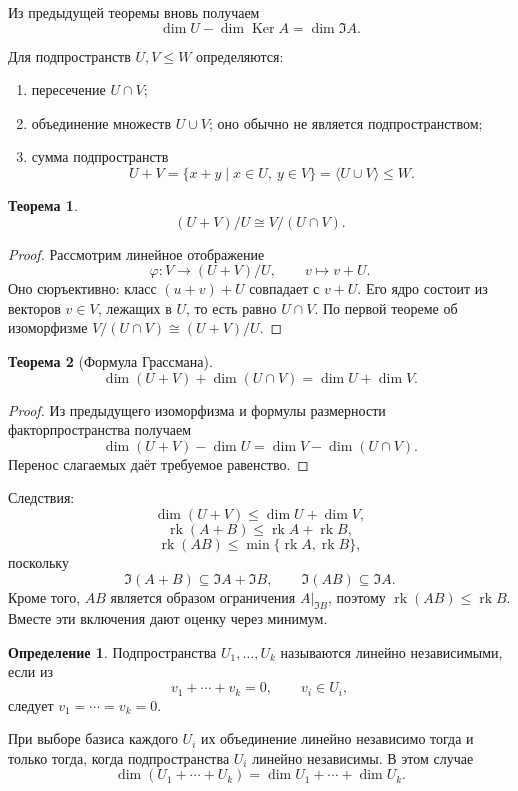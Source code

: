 \documentclass[12pt,a4paper,oneside,openany]{book}
\theoremstyle{definition}
\newtheorem{definition}{Определение}[chapter]
\theoremstyle{plain}
\newtheorem{theorem}{Теорема}[chapter]
\theoremstyle{remark}
\DeclareMathOperator{\Ker}{Ker}
\DeclareMathOperator{\rk}{rk}
\begin{document}
Из предыдущей теоремы вновь получаем
\[
  \dim U-\dim\Ker A=\dim\Im A.
\]

Для подпространств $U,V\leq W$ определяются:
\begin{enumerate}[label=\arabic*)]
  \item пересечение $U\cap V$;
  \item объединение множеств $U\cup V$; оно обычно не является
  подпространством;
  \item сумма подпространств
  \[
    U+V=\{x+y\mid x\in U,\ y\in V\}=\langle U\cup V\rangle\leq W.
  \]
\end{enumerate}

\begin{theorem}
\[
  (U+V)/U\cong V/(U\cap V).
\]
\end{theorem}

\begin{proof}
Рассмотрим линейное отображение
\[
  \varphi\colon V\to(U+V)/U,\qquad v\mapsto v+U.
\]
Оно сюръективно: класс $(u+v)+U$ совпадает с $v+U$. Его ядро состоит из
векторов $v\in V$, лежащих в $U$, то есть равно $U\cap V$. По первой
теореме об изоморфизме
$V/(U\cap V)\cong(U+V)/U$.
\end{proof}

\begin{theorem}[Формула Грассмана]
\[
  \dim(U+V)+\dim(U\cap V)=\dim U+\dim V.
\]
\end{theorem}

\begin{proof}
Из предыдущего изоморфизма и формулы размерности факторпространства
получаем
\[
  \dim(U+V)-\dim U=\dim V-\dim(U\cap V).
\]
Перенос слагаемых даёт требуемое равенство.
\end{proof}

Следствия:
\[
  \dim(U+V)\leq\dim U+\dim V,
\]
\[
  \rk(A+B)\leq\rk A+\rk B,
\]
\[
  \rk(AB)\leq\min\{\rk A,\rk B\},
\]
поскольку
\[
  \Im(A+B)\subseteq\Im A+\Im B,\qquad
  \Im(AB)\subseteq\Im A.
\]
Кроме того, $AB$ является образом ограничения $A|_{\Im B}$, поэтому
$\rk(AB)\leq\rk B$. Вместе эти включения дают оценку через минимум.


\begin{definition}
Подпространства $U_1,\ldots,U_k$ называются линейно независимыми, если из
\[
  v_1+\cdots+v_k=0,
  \qquad v_i\in U_i,
\]
следует $v_1=\cdots=v_k=0$.
\end{definition}

При выборе базиса каждого $U_i$ их объединение линейно независимо тогда
и только тогда, когда подпространства $U_i$ линейно независимы. В этом
случае
\[
  \dim(U_1+\cdots+U_k)=\dim U_1+\cdots+\dim U_k.
\]
\end{document}
